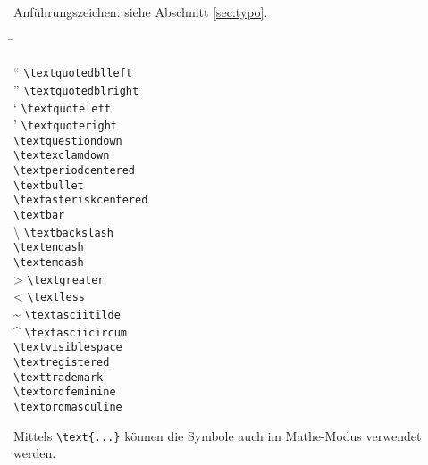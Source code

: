 Anführungszeichen: siehe Abschnitt \ref{sec:typo}.
\begin{tabbing}
\hspace{1.5em} \= \kill

	\textquotedblleft 	\>	\lstinline|\textquotedblleft|			\\
	\textquotedblright 	\>	\lstinline|\textquotedblright|		\\
	\textquoteleft 			\>	\lstinline|\textquoteleft|				\\
	\textquoteright 		\>	\lstinline|\textquoteright|				\\
	\textquestiondown 	\>	\lstinline|\textquestiondown|			\\
	\textexclamdown 		\>	\lstinline|\textexclamdown|		\\
	\textperiodcentered \>	\lstinline|\textperiodcentered|		\\
	\textbullet 				\>	\lstinline|\textbullet|				\\
	\textasteriskcentered \>\lstinline|\textasteriskcentered|	\\
	
	\textbar 						\>	\lstinline|\textbar|					\\
	\textbackslash 			\>	\lstinline|\textbackslash|		\\
	\textendash 				\>	\lstinline|\textendash|				\\
	\textemdash 				\>	\lstinline|\textemdash|				\\
	\textgreater 				\>	\lstinline|\textgreater|			\\
	\textless 					\>	\lstinline|\textless|					\\
	\textasciitilde 		\>	\lstinline|\textasciitilde|		\\
	\textasciicircum 		\>	\lstinline|\textasciicircum|	\\
	\textvisiblespace 	\>	\lstinline|\textvisiblespace|	\\

	\textregistered 		\>	\lstinline|\textregistered|		\\
	\texttrademark 			\>	\lstinline|\texttrademark|		\\
	\textordfeminine 		\>	\lstinline|\textordfeminine|	\\
	\textordmasculine 	\>	\lstinline|\textordmasculine|	\\
	
\end{tabbing}
%
Mittels \lstinline|\text{...}| können die Symbole auch im Mathe-Modus verwendet werden. 

